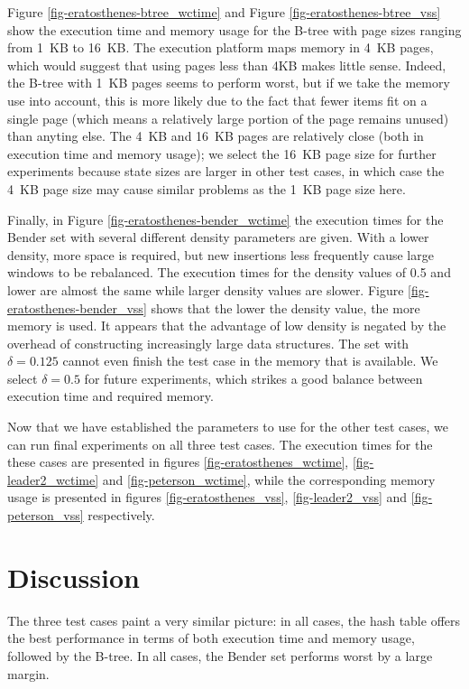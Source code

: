 \documentclass{acm_proc_article-sp}
\begin{document}
Figure \ref{fig-eratosthenes-btree_wctime} and Figure
\ref{fig-eratosthenes-btree_vss} show the execution time and memory usage
for the B-tree with page sizes ranging from 1~KB to 16~KB. The execution platform
maps memory in 4~KB pages, which would suggest that using pages less than 4KB
makes little sense. Indeed, the B-tree with 1~KB pages seems to perform worst,
but if we take the memory use into account, this is more likely due to the fact
that fewer items fit on a single page (which means a relatively large portion of
the page remains unused) than anyting else.
The 4~KB and 16~KB pages are relatively close (both in execution time and memory
usage); we select the 16~KB page size for further experiments because state sizes
are larger in other test cases, in which case the 4~KB page size may cause similar
problems as the 1~KB page size here.

Finally, in Figure \ref{fig-eratosthenes-bender_wctime} the execution times for
the Bender set with several different density parameters are given. With a lower
density, more space is required, but new insertions less frequently cause large windows to be rebalanced.
The execution times for the density values of 0.5 and lower are almost the same
while larger density values are slower.
Figure \ref{fig-eratosthenes-bender_vss} shows that the lower the density value,
the more memory is used. It appears that the advantage of low density is
negated by the overhead of constructing increasingly large data structures.
The set with $\delta=0.125$ cannot even finish the test case in the memory
that is available. We select $\delta=0.5$ for future experiments, which strikes
a good balance between execution time and required memory.

Now that we have established the parameters to use for the other test cases,
we can run final experiments on all three test cases.
The execution times for the these cases are presented in figures
\ref{fig-eratosthenes_wctime}, \ref{fig-leader2_wctime} and
\ref{fig-peterson_wctime}, while the corresponding memory usage is presented in
figures \ref{fig-eratosthenes_vss}, \ref{fig-leader2_vss} and \ref{fig-peterson_vss} respectively.

\section{Discussion}
The three test cases paint a very similar picture: in all cases, the hash table
offers the best performance in terms of both execution time and memory usage,
followed by the B-tree. In all cases, the Bender set performs worst by a large
margin.
\end{document}
